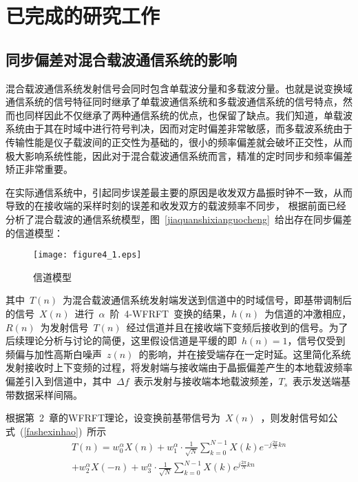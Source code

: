 
\section{已完成的研究工作}
\subsection{同步偏差对混合载波通信系统的影响}

混合载波通信系统发射信号会同时包含单载波分量和多载波分量。也就是说变换域通信系统的信号特征同时继承了单载波通信系统和多载波通信系统的信号特点，然而也同样因此不仅继承了两种通信系统的优点，也保留了缺点。我们知道，单载波系统由于其在时域中进行符号判决，因而对定时偏差非常敏感，而多载波系统由于传输性能是仪子载波间的正交性为基础的，很小的频率偏差就会破坏正交性，从而极大影响系统性能，因此对于混合载波通信系统而言，精准的定时同步和频率偏差矫正非常重要。

在实际通信系统中，引起同步误差最主要的原因是收发双方晶振时钟不一致，从而导致的在接收端的采样时刻的误差和收发双方的载波频率不同步， 根据前面已经分析了混合载波的通信系统模型，图~\ref{jiaquanshixianguocheng}~给出存在同步偏差的信道模型：
\begin{figure}[htbp]
\centering
\texttt{[image: figure4\_1.eps]}
\caption{信道模型}\vspace{-1em}\label{xindaomoxing}
\end{figure}
其中~$T(n)$~为混合载波通信系统发射端发送到信道中的时域信号，即基带调制后的信号~$X(n)$~进行~$\alpha$~阶~4-WFRFT~变换的结果，$h(n)$~为信道的冲激相应，$R(n)$~为发射信号~$T(n)$~经过信道并且在接收端下变频后接收到的信号。为了后续理论分析与讨论的简便，这里假设信道是平缓的即~$h(n)=1$，信号仅受到频偏与加性高斯白噪声~$z(n)$~的影响，并在接受端存在一定时延。这里简化系统发射接收时上下变频的过程，将发射端与接收端由于晶振偏差产生的本地载波频率偏差引入到信道中，其中~$\Delta f$~表示发射与接收端本地载波频差，$T_s$~表示发送端基带数据采样间隔。

根据第~2~章的WFRFT理论，设变换前基带信号为~$X(n)$~，则发射信号如公式~(\ref{fashexinhao})~所示
\begin{equation}\label{fashexinhao}
\begin{split}
T(n) = w_0^\alpha X(n) + w_1^\alpha  \cdot \frac{1}{{\sqrt N }}\sum\limits_{k = 0}^{N - 1} {X(k){e^{ - j\frac{{2\pi }}{N}kn}}} \\
  + w_2^\alpha X( - n) + w_3^\alpha  \cdot \frac{1}{{\sqrt N }}\sum\limits_{k = 0}^{N - 1} {X(k){e^{j\frac{{2\pi }}{N}kn}}}
\end{split}
\end{equation}


